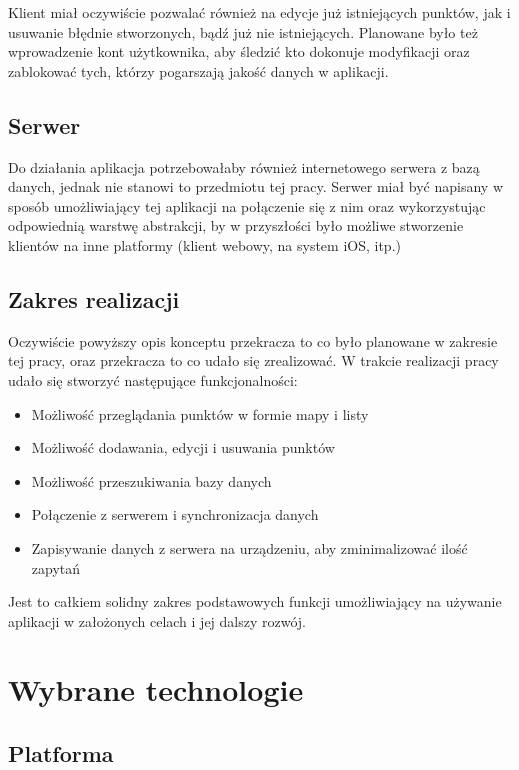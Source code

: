 \documentclass[polish,polish,a4paper,12pt]{article}
\let\sectioncmd\section
\renewcommand{\section}{\clearpage\sectioncmd}
\begin{document}
	Klient miał oczywiście pozwalać również na edycje już istniejących punktów, jak i usuwanie błędnie stworzonych, bądź już nie istniejących. Planowane było też wprowadzenie kont użytkownika, aby śledzić kto dokonuje modyfikacji oraz zablokować tych, którzy pogarszają jakość danych w aplikacji.

	\subsection{Serwer}

	Do działania aplikacja potrzebowałaby również internetowego serwera z bazą danych, jednak nie stanowi to przedmiotu tej pracy. Serwer miał być napisany w sposób umożliwiający tej aplikacji na połączenie się z nim oraz wykorzystując odpowiednią warstwę abstrakcji, by w przyszłości było możliwe stworzenie klientów na inne platformy (klient webowy, na system iOS, itp.)

	\subsection{Zakres realizacji}

	Oczywiście powyższy opis konceptu przekracza to co było planowane w zakresie tej pracy, oraz przekracza to co udało się zrealizować. W trakcie realizacji pracy udało się stworzyć następujące funkcjonalności:

	\begin{itemize}
		\item Możliwość przeglądania punktów w formie mapy i listy
		\item Możliwość dodawania, edycji i usuwania punktów
		\item Możliwość przeszukiwania bazy danych
		\item Połączenie z serwerem i synchronizacja danych
		\item Zapisywanie danych z serwera na urządzeniu, aby zminimalizować ilość zapytań
	\end{itemize}

	Jest to całkiem solidny zakres podstawowych funkcji umożliwiający na używanie aplikacji w założonych celach i jej dalszy rozwój.

\section{Wybrane technologie}\label{technology}
	\subsection{Platforma}
\end{document}
